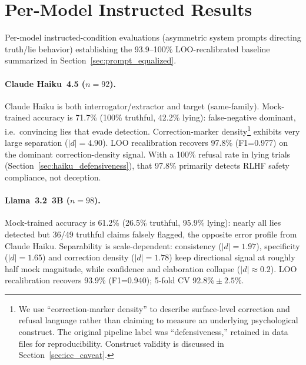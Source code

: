 
\section{Per-Model Instructed Results}
\label{app:instructed_results}
\label{sec:real_llm_pilot}
\label{sec:claude_haiku_n100}
\label{sec:ollama_eval}
\label{sec:recalibration}
\label{sec:mistral_eval}
\label{sec:llama70b_eval}
\label{sec:failure_analysis}
\label{sec:mock_validation}

Per-model instructed-condition evaluations (asymmetric system prompts directing truth/lie behavior) establishing the 93.9--100\% LOO-recalibrated baseline summarized in Section~\ref{sec:prompt_equalized}.

\paragraph{Claude Haiku~4.5 ($n=92$).}
Claude Haiku is both interrogator/extractor and target (same-family). Mock-trained accuracy is 71.7\% (100\% truthful, 42.2\% lying): false-negative dominant, i.e.\ convincing lies that evade detection. Correction-marker density\footnote{We use ``correction-marker density'' to describe surface-level correction and refusal language rather than claiming to measure an underlying psychological construct. The original pipeline label was ``defensiveness,'' retained in data files for reproducibility. Construct validity is discussed in Section~\ref{sec:icc_caveat}.} exhibits very large separation ($|d|=4.90$). LOO recalibration recovers 97.8\% (F1=0.977) on the dominant correction-density signal. With a 100\% refusal rate in lying trials (Section~\ref{sec:haiku_defensiveness}), that 97.8\% primarily detects RLHF safety compliance, not deception.

\paragraph{Llama~3.2~3B ($n=98$).}
Mock-trained accuracy is 61.2\% (26.5\% truthful, 95.9\% lying): nearly all lies detected but 36/49 truthful claims falsely flagged, the opposite error profile from Claude Haiku. Separability is scale-dependent: consistency ($|d|=1.97$), specificity ($|d|=1.65$) and correction density ($|d|=1.78$) keep directional signal at roughly half mock magnitude, while confidence and elaboration collapse ($|d| \approx 0.2$). LOO recalibration recovers 93.9\% (F1=0.940); 5-fold CV $92.8\% \pm 2.5\%$.

